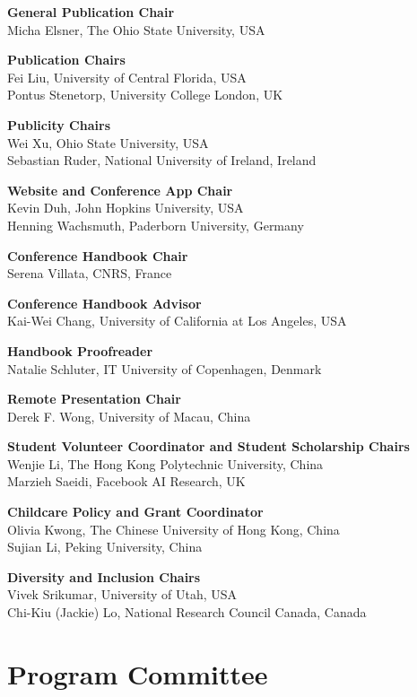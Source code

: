 {\bf General Publication Chair} \\
Micha Elsner, The Ohio State University, USA


{\bf Publication Chairs} \\
Fei Liu, University of Central Florida, USA \\
Pontus Stenetorp, University College London, UK


{\bf Publicity Chairs}\\
Wei Xu, Ohio State University, USA \\
Sebastian Ruder, National University of Ireland, Ireland


{\bf Website and Conference App Chair}\\
Kevin Duh, John Hopkins University, USA \\
Henning Wachsmuth, Paderborn University, Germany


{\bf Conference Handbook Chair}\\
Serena Villata, CNRS, France


{\bf Conference Handbook Advisor}\\
Kai-Wei Chang, University of California at Los Angeles, USA


{\bf Handbook Proofreader}\\
Natalie Schluter, IT University of Copenhagen, Denmark


{\bf Remote Presentation Chair}\\
Derek F. Wong, University of Macau, China


{\bf Student Volunteer Coordinator and Student Scholarship Chairs}\\
Wenjie Li, The Hong Kong Polytechnic University, China \\
Marzieh Saeidi, Facebook AI Research, UK  

\newpage
{\bf Childcare Policy and Grant Coordinator}\\
Olivia Kwong, The Chinese University of Hong Kong, China \\
Sujian Li, Peking University, China


{\bf Diversity and Inclusion Chairs}\\
Vivek Srikumar, University of Utah, USA \\
Chi-Kiu (Jackie) Lo, National Research Council Canada, Canada


\clearpage
\section{Program Committee}
\setlength{\parindent}{0pt}

